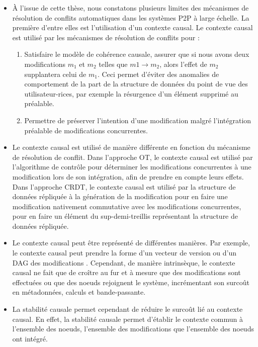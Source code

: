 \begin{itemize}
    \item À l'issue de cette thèse, nous constatons plusieurs limites des mécanismes de résolution de conflits automatiques dans les systèmes \ac{P2P} à large échelle.
        La première d'entre elles est l'utilisation d'un contexte causal.
        Le contexte causal est utilisé par les mécanismes de résolution de conflits pour :
        \begin{enumerate}
            \item Satisfaire le modèle de cohérence causale, \ie assurer que si nous avons deux modifications $m_1$ et $m_2$ telles que $m1 \to m_2$, alors l'effet de $m_2$ supplantera celui de $m_1$.
                Ceci permet d'éviter des anomalies de comportement de la part de la structure de données du point de vue des utilisateur-rices, par exemple la résurgence d'un élément supprimé au préalable.
            \item Permettre de préserver l'intention d'une modification malgré l'intégration préalable de modifications concurrentes.
        \end{enumerate}
    \item Le contexte causal est utilisé de manière différente en fonction du mécanisme de résolution de conflit.
        Dans l'approche \ac{OT}, le contexte causal est utilisé par l'algorithme de contrôle pour déterminer les modifications concurrentes à une modification lors de son intégration, afin de prendre en compte leurs effets.
        Dans l'approche \ac{CRDT}, le contexte causal est utilisé par la structure de données répliquée à la génération de la modification pour en faire une modification nativement commutative avec les modifications concurrentes, \ie pour en faire un élément du sup-demi-treillis représentant la structure de données répliquée.
    \item Le contexte causal peut être représenté de différentes manières.
        Par exemple, le contexte causal peut prendre la forme d'un vecteur de version \cite{1988-version-vector-mattern,1991-version-vector-fidge} ou d'un \ac{DAG} des modifications \cite{1997-causal-barrier}.
        Cependant, de manière intrinsèque, le contexte causal ne fait que de croître au fur et à mesure que des modifications sont effectuées ou que des noeuds rejoignent le système, incrémentant son surcoût en métadonnées, calculs et bande-passante.
    \item La stabilité causale permet cependant de réduire le surcoût lié au contexte causal.
        En effet, la stabilité causale permet d'établir le contexte commun à l'ensemble des noeuds, \ie l'ensemble des modifications que l'ensemble des noeuds ont intégré.

\end{itemize}
